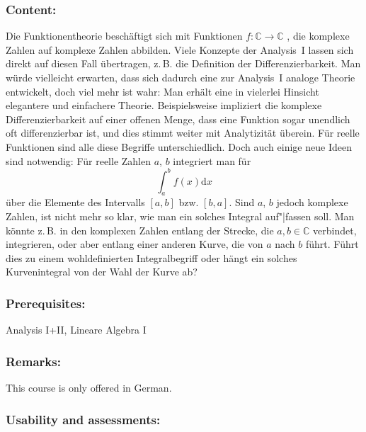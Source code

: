 \documentclass[a4paper,10pt]{article}
\begin{document}
\subsubsection*{\large
    Content:
}
Die Funktionentheorie beschäftigt sich mit Funktionen $f : \mathbb C \to \mathbb C$ , die komplexe Zahlen auf komplexe
Zahlen abbilden. Viele Konzepte der Analysis~I lassen sich direkt auf diesen Fall übertragen, z.\,B. die
Definition der Differenzierbarkeit. Man würde vielleicht erwarten, dass sich dadurch eine zur Analysis~I
analoge Theorie entwickelt, doch viel mehr ist wahr: Man erhält eine in vielerlei Hinsicht elegantere und
einfachere Theorie. Beispielsweise impliziert die komplexe Differenzierbarkeit auf einer offenen Menge, dass
eine Funktion sogar unendlich oft differenzierbar ist, und dies stimmt weiter mit Analytizität überein. Für
reelle Funktionen sind alle diese Begriffe unterschiedlich. Doch auch einige neue Ideen sind notwendig: Für
reelle Zahlen $a$, $b$ integriert man für
$$\int_a^b f(x) \mathrm dx$$
über die Elemente des Intervalls $[a, b]$ bzw. $[b, a]$. Sind $a$, $b$ jedoch komplexe Zahlen, ist nicht mehr so
klar, wie man ein solches Integral auf"|fassen soll. Man könnte z.\,B. in den komplexen Zahlen entlang der
Strecke, die $a, b \in \mathbb C$ verbindet, integrieren, oder aber entlang einer anderen Kurve, die von $a$ nach $b$ führt.
Führt dies zu einem wohldefinierten Integralbegriff oder hängt ein solches Kurvenintegral von der Wahl
der Kurve ab?
\subsubsection*{\large
    Prerequisites:
}
Analysis I+II, Lineare Algebra I
\subsubsection*{\large
    Remarks:
}
This course is only offered in German.
\cleardoublepage
\subsubsection*{\large
    Usability and assessments:
}
\end{document}
